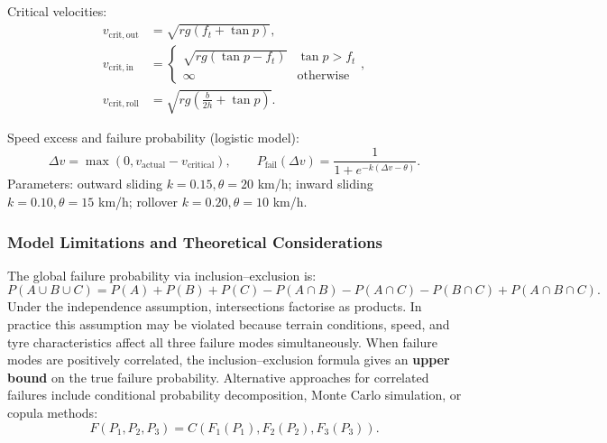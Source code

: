 Critical velocities:
\begin{align}
v_{\mathrm{crit,out}}  &= \sqrt{rg(f_t+\tan p)}, \label{eq:vcrit_out}\\
v_{\mathrm{crit,in}}   &= \begin{cases}\sqrt{rg(\tan p - f_t)} & \tan p > f_t\\\infty & \text{otherwise}\end{cases}, \label{eq:vcrit_in}\\
v_{\mathrm{crit,roll}} &= \sqrt{rg\!\left(\tfrac{b}{2h}+\tan p\right)}. \label{eq:vcrit_roll}
\end{align}

Speed excess and failure probability (logistic model):
\begin{equation}
\Delta v = \max(0,v_{\mathrm{actual}}-v_{\mathrm{critical}}), \qquad
P_{\mathrm{fail}}(\Delta v) = \frac{1}{1+e^{-k(\Delta v-\theta)}}.
\label{eq:failure_probability}
\end{equation}
Parameters: outward sliding $k=0.15,\theta=20$ km/h; inward sliding
$k=0.10,\theta=15$ km/h; rollover $k=0.20,\theta=10$ km/h.

\subsubsection*{Model Limitations and Theoretical Considerations}
The global failure probability via inclusion--exclusion is:
\begin{equation}
P(A\cup B\cup C)=P(A)+P(B)+P(C)-P(A\cap B)-P(A\cap C)-P(B\cap C)+P(A\cap B\cap C).
\label{eq:global_probability}
\end{equation}
Under the independence assumption, intersections factorise as products.
In practice this assumption may be violated because terrain conditions,
speed, and tyre characteristics affect all three failure modes simultaneously.
When failure modes are positively correlated, the inclusion--exclusion formula
gives an \textbf{upper bound} on the true failure probability. Alternative
approaches for correlated failures include conditional probability
decomposition, Monte Carlo simulation, or copula methods:
\begin{equation}
F(P_1,P_2,P_3)=C(F_1(P_1),F_2(P_2),F_3(P_3)).
\end{equation}

